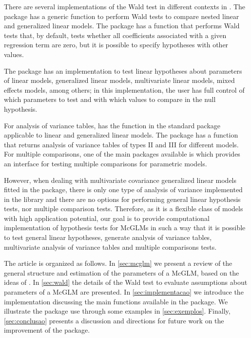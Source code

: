 \documentclass[article]{jss}\usepackage[]{graphicx}\usepackage[]{xcolor}
\begin{document}
There are several implementations of the Wald test in different contexts in . The package  \citep{lmtest} has a generic function to perform Wald tests to compare nested linear and generalized linear models. The package  \citep{survey1,survey2,survey3} has a function that performs Wald tests that, by default, tests whether all coefficients associated with a given regression term are zero, but it is possible to specify hypotheses with other values.

The package  \citep{car} has an implementation to test linear hypotheses about parameters of linear models, generalized linear models, multivariate linear models, mixed effects models, among others; in this implementation, the user has full control of which parameters to test and with which values to compare in the null hypothesis.

For analysis of variance tables,  has the function  in the standard package  \citep{R2022} applicable to linear and generalized linear models. The package  \citep{car} has a function that returns analysis of variance tables of types II and III for different models. For multiple comparisons, one of the main packages available is  \citep{multcomp} which provides an interface for testing multiple comparisons for parametric models.

However, when dealing with multivariate covariance generalized linear models fitted in the  package, there is only one type of analysis of variance implemented in the library and there are no options for performing general linear hypothesis tests, nor multiple comparison tests. Therefore, as it is a flexible class of models with high application potential, our goal is to provide computational implementation of hypothesis tests for McGLMs in such a way that it is possible to test general linear hypotheses, generate analysis of variance tables, multivariate analysis of variance tables and multiple comparisons tests.

The article is organized as follows. In \autoref{sec:mcglm} we present a review of the general structure and estimation of the parameters of a McGLM, based on the ideas of \citet{Bonat16}. In \autoref{sec:wald} the details of the Wald test to evaluate assumptions about parameters of a McGLM are presented. In \autoref{sec:implementacao} we introduce the  implementation discussing the main functions available in the  package. We illustrate the package use through some examples in \autoref{sec:exemplos}. Finally, \autoref{sec:conclusao} presents a discussion and directions for future work on the improvement of the  package.
\end{document}
